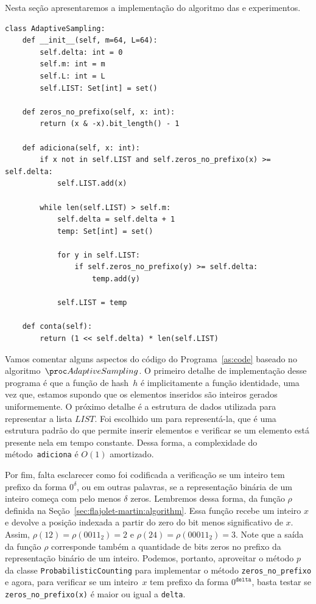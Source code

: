 Nesta seção apresentaremos a implementação do algoritmo das   e experimentos.

\begin{lstlisting}[style=mypython,caption=Implementação do algoritmo $\AS$,captionpos=b, label=as:code]
class AdaptiveSampling:
    def __init__(self, m=64, L=64):
        self.delta: int = 0
        self.m: int = m
        self.L: int = L
        self.LIST: Set[int] = set()
   
    def zeros_no_prefixo(self, x: int):
        return (x & -x).bit_length() - 1

    def adiciona(self, x: int):
        if x not in self.LIST and self.zeros_no_prefixo(x) >= self.delta:
            self.LIST.add(x)

        while len(self.LIST) > self.m:
            self.delta = self.delta + 1
            temp: Set[int] = set()

            for y in self.LIST:
                if self.zeros_no_prefixo(y) >= self.delta:
                    temp.add(y)

            self.LIST = temp

    def conta(self):
        return (1 << self.delta) * len(self.LIST)
\end{lstlisting}

Vamos comentar alguns aspectos do código do Programa~\ref{as:code} baseado no algoritmo~$\AS$. O primeiro detalhe de 
implementação desse programa é que a função de hash~$h$ é implicitamente a função identidade, uma vez que, estamos 
supondo que os elementos inseridos são inteiros gerados uniformemente. O próximo detalhe é a estrutura de dados 
utilizada para representar a lista $LIST$. Foi escolhido um  para representá-la, que é uma estrutura padrão do 
 que permite inserir elementos e verificar se um elemento está presente nela em tempo constante. Dessa 
forma, a complexidade do método~\texttt{adiciona} é $O(1)$ amortizado.

Por fim, falta esclarecer como foi codificada a verificação se um inteiro tem prefixo da forma $0^{\delta}$, ou em 
outras palavras, se a representação binária de um inteiro começa com pelo menos $\delta$ zeros. Lembremos dessa forma, 
da função $\rho$ definida na Seção~\ref{sec:flajolet-martin:algorithm}. Essa função recebe um inteiro $x$ e devolve a 
posição indexada a partir do zero do bit menos significativo de $x$. Assim, $\rho(12) = \rho(0011_2) = 2$ e 
$\rho(24) = \rho(00011_2) = 3$. Note que a saída da função $\rho$ corresponde também a quantidade de bits zeros no 
prefixo da representação binário de um inteiro. Podemos, portanto, aproveitar o método $p$ da classe 
\texttt{ProbabilisticCounting} para implementar o método \texttt{zeros\_no\_prefixo} e agora, para verificar se um 
inteiro~$x$ tem prefixo da forma $0^{\texttt{delta}}$, basta testar se \texttt{zeros\_no\_prefixo(x)} é maior ou igual a
\texttt{delta}.

